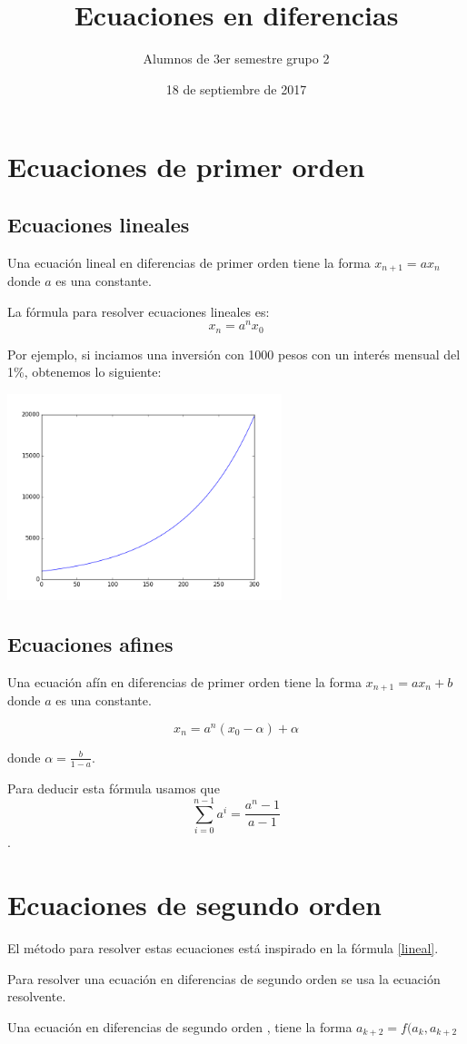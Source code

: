 \documentclass{article}
\title{Ecuaciones en diferencias}
\author{Alumnos de 3er semestre grupo 2}
\date{18 de septiembre de 2017}
\begin{document}
\maketitle

\section{Ecuaciones de primer orden}

\subsection{Ecuaciones lineales}

Una ecuación lineal en diferencias de primer orden tiene la forma $x_{n+1}=ax_n$ donde $a$ es una constante. 

La fórmula para resolver ecuaciones lineales es:
\begin{equation}
  \label{lineal}
  x_n=a^nx_0
\end{equation}

Por ejemplo, si inciamos una inversión con 1000 pesos con un interés mensual del 1\%, obtenemos lo siguiente:

\begin{center}
  \includegraphics[width=8cm]{inversion.png}
\end{center}

\subsection{Ecuaciones afines}

Una ecuación afín en diferencias de primer orden tiene la forma $x_{n+1}=ax_n+b$ donde $a$ es una constante. 

\begin{equation}
  \label{afin}
  x_n=a^n(x_0-\alpha)+\alpha
\end{equation}

donde $\alpha=\frac{b}{1-a}$. 

Para deducir esta fórmula usamos que $$\sum_{i=0}^{n-1}a^i=\frac{a^n-1}{a-1}$$.

\section{Ecuaciones de segundo orden}

El método para resolver estas ecuaciones está inspirado en la fórmula \ref{lineal}.

Para resolver una ecuación en diferencias de segundo orden se usa la ecuación resolvente.

Una ecuación en diferencias de segundo orden , tiene la forma $a_{k+2}=f(a_k ,a_{k+2}$
\end{document}
